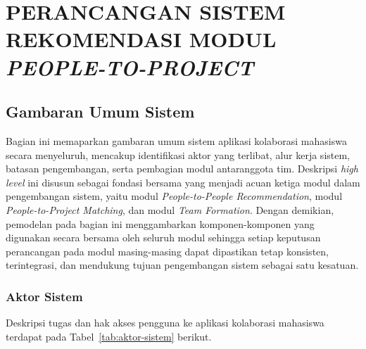 ﻿%

\cleardoublepage
\chapter{PERANCANGAN SISTEM REKOMENDASI MODUL \emph{PEOPLE-TO-PROJECT}}
\label{chap:perancangan}

\section{Gambaran Umum Sistem}

Bagian ini memaparkan gambaran umum sistem aplikasi kolaborasi mahasiswa secara menyeluruh, mencakup identifikasi aktor yang terlibat, alur kerja sistem, batasan pengembangan, serta pembagian modul antaranggota tim. Deskripsi \emph{high level} ini disusun sebagai fondasi bersama yang menjadi acuan ketiga modul dalam pengembangan sistem, yaitu modul \emph{People-to-People Recommendation}, modul \emph{People-to-Project Matching}, dan modul \emph{Team Formation}. Dengan demikian, pemodelan pada bagian ini menggambarkan komponen-komponen yang digunakan secara bersama oleh seluruh modul sehingga setiap keputusan perancangan pada modul masing-masing dapat dipastikan tetap konsisten, terintegrasi, dan mendukung tujuan pengembangan sistem sebagai satu kesatuan.

\subsection{Aktor Sistem}

Deskripsi tugas dan hak akses pengguna ke aplikasi kolaborasi mahasiswa terdapat pada Tabel~\ref{tab:aktor-sistem} berikut.

